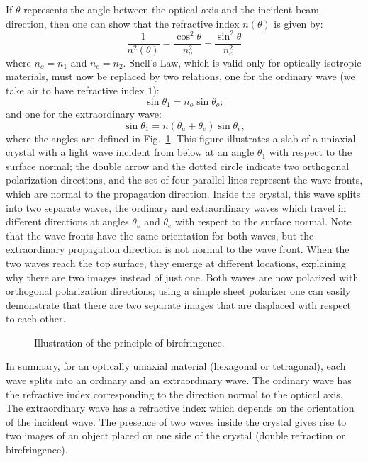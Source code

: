 If $\theta$ represents the angle between the optical axis and the incident beam direction, then one can show that the refractive index $n(\theta)$ is given by:
\[
	\frac{1}{n^2(\theta)} = \frac{\cos^2\theta}{n^2_o}+\frac{\sin^2\theta}{n^2_e}
\]
where $n_o=n_1$ and $n_e=n_2$.  Snell's Law, which is valid only for optically isotropic materials, must now be replaced by two relations, one for the ordinary wave (we take air to have refractive index $1$):
\[
	\sin\theta_1 = n_o\sin\theta_o;
\]
and one for the extraordinary wave:
\[
	\sin\theta_1 = n(\theta_a+\theta_e)\sin\theta_e,
\]
where the angles are defined in Fig.~\ref{\chabbr:fig:birefringence}.  This figure illustrates a slab of a uniaxial crystal with a light wave incident from below at an angle $\theta_1$ with respect to the surface normal; the double arrow and the dotted circle indicate two orthogonal polarization directions, and the set of four parallel lines represent the wave fronts, which are normal to the propagation direction. Inside the crystal, this wave splits into two separate waves, the ordinary and extraordinary waves which travel in different directions at angles $\theta_o$ and $\theta_e$ with respect to the surface normal. Note that the wave fronts have the same orientation for both waves, but the extraordinary propagation direction is not normal to the wave front.  When the two waves reach the top surface, they emerge at different locations, explaining why there are two images instead of just one.  Both waves are now polarized with orthogonal polarization directions; using a simple sheet polarizer one can easily demonstrate that there are two separate images that are displaced with respect to each other.

\begin{figure}[ht]
\centering\leavevmode
\caption{Illustration of the principle of birefringence.}
\label{\chabbr:fig:birefringence}
\end{figure}

In summary, for an optically uniaxial material (hexagonal or tetragonal), each wave splits into an ordinary and an extraordinary wave.  The ordinary wave has the refractive index corresponding to the direction normal to the optical axis.  The extraordinary wave has a refractive index which depends on the orientation of the incident wave.  The presence of two waves inside the crystal gives rise to two images of an object placed on one side of the crystal (double refraction or birefringence).

